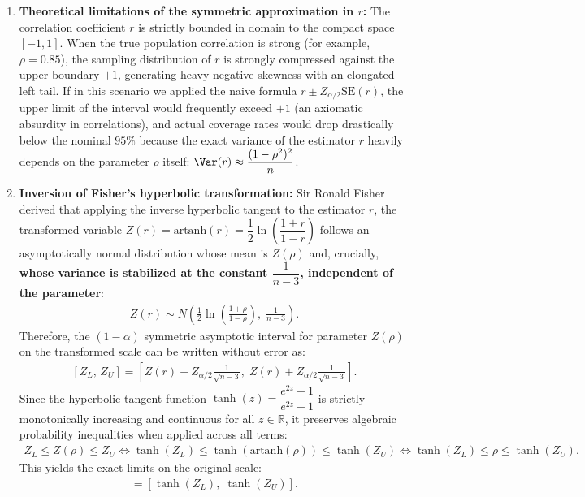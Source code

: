 \begin{solucion}
	\begin{enumerate}
		\item \textbf{Theoretical limitations of the symmetric approximation in $r$:}
		The correlation coefficient $r$ is strictly bounded in domain to the compact space $[-1, 1]$. When the true population correlation is strong (for example, $\rho = 0.85$), the sampling distribution of $r$ is strongly compressed against the upper boundary $+1$, generating heavy negative skewness with an elongated left tail. If in this scenario we applied the naive formula $r \pm Z_{\alpha/2}\text{SE}(r)$, the upper limit of the interval would frequently exceed $+1$ (an axiomatic absurdity in correlations), and actual coverage rates would drop drastically below the nominal $95\%$ because the exact variance of the estimator $r$ heavily depends on the parameter $\rho$ itself: $\Var(r) \approx \dfrac{(1-\rho^2)^2}{n}$.
		
		\item \textbf{Inversion of Fisher's hyperbolic transformation:}
		Sir Ronald Fisher derived that applying the inverse hyperbolic tangent to the estimator $r$, the transformed variable $Z(r) = \text{artanh}(r) = \dfrac{1}{2}\ln\left(\dfrac{1+r}{1-r}\right)$ follows an asymptotically normal distribution whose mean is $Z(\rho)$ and, crucially, \textbf{whose variance is stabilized at the constant $\dfrac{1}{n-3}$, independent of the parameter}:
		\begin{align}
			Z(r) \sim N\left( \frac{1}{2}\ln\left(\frac{1+\rho}{1-\rho}\right), \; \frac{1}{n-3} \right).
		\end{align}
		Therefore, the $(1-\alpha)$ symmetric asymptotic interval for parameter $Z(\rho)$ on the transformed scale can be written without error as:
		\begin{align}
			\left[ Z_L, \, Z_U \right] = \left[ Z(r) - Z_{\alpha/2} \frac{1}{\sqrt{n-3}}, \; Z(r) + Z_{\alpha/2} \frac{1}{\sqrt{n-3}} \right].
		\end{align}
		Since the hyperbolic tangent function $\tanh(z) = \dfrac{e^{2z}-1}{e^{2z}+1}$ is strictly monotonically increasing and continuous for all $z \in \mathbb{R}$, it preserves algebraic probability inequalities when applied across all terms:
		\begin{align}
			Z_L \le Z(\rho) \le Z_U \iff \tanh(Z_L) \le \tanh\left(\text{artanh}(\rho)\right) \le \tanh(Z_U) \iff \tanh(Z_L) \le \rho \le \tanh(Z_U).
		\end{align}
		This yields the exact limits on the original scale:
		\begin{align}
			[L_\rho, \, U_\rho] = \left[ \tanh(Z_L), \; \tanh(Z_U) \right].
		\end{align}
		

\end{enumerate}
\end{solucion}
